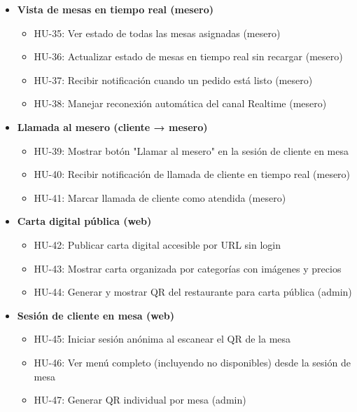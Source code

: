 \begin{itemize}[leftmargin=1.5em]

\item \textbf{Vista de mesas en tiempo real (mesero)}

\begin{itemize}
\item HU-35: Ver estado de todas las mesas asignadas (mesero)
\item HU-36: Actualizar estado de mesas en tiempo real sin recargar (mesero)
\item HU-37: Recibir notificación cuando un pedido está listo (mesero)
\item HU-38: Manejar reconexión automática del canal Realtime (mesero)
\end{itemize}

\item \textbf{Llamada al mesero (cliente → mesero)}

\begin{itemize}
\item HU-39: Mostrar botón "Llamar al mesero" en la sesión de cliente en mesa
\item HU-40: Recibir notificación de llamada de cliente en tiempo real (mesero)
\item HU-41: Marcar llamada de cliente como atendida (mesero)
\end{itemize}

\item \textbf{Carta digital pública (web)}

\begin{itemize}
\item HU-42: Publicar carta digital accesible por URL sin login
\item HU-43: Mostrar carta organizada por categorías con imágenes y precios
\item HU-44: Generar y mostrar QR del restaurante para carta pública (admin)
\end{itemize}

\item \textbf{Sesión de cliente en mesa (web)}

\begin{itemize}
\item HU-45: Iniciar sesión anónima al escanear el QR de la mesa
\item HU-46: Ver menú completo (incluyendo no disponibles) desde la sesión de mesa
\item HU-47: Generar QR individual por mesa (admin)
\end{itemize}


\end{itemize}
